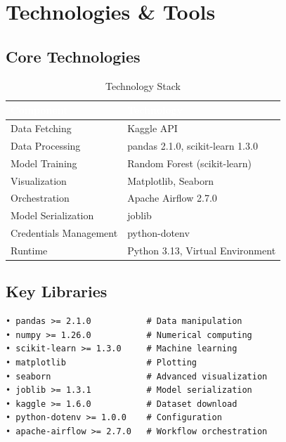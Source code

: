 \documentclass[11pt,a4paper]{article}
\begin{document}
\section{Technologies \& Tools}

\subsection{Core Technologies}

\begin{table}[H]
\centering
\caption{Technology Stack}
\small
\begin{tabular}{L{2.5cm} L{4cm}}
\toprule
{}
\textcolor{white}{\textbf{Component}} &
\textcolor{white}{\textbf{Technology}} \\
\midrule
Data Fetching & Kaggle API \\
Data Processing & pandas 2.1.0, scikit-learn 1.3.0 \\
Model Training & Random Forest (scikit-learn) \\
Visualization & Matplotlib, Seaborn \\
Orchestration & Apache Airflow 2.7.0 \\
Model Serialization & joblib \\
Credentials Management & python-dotenv \\
Runtime & Python 3.13, Virtual Environment \\
\bottomrule
\end{tabular}
\end{table}

\subsection{Key Libraries}

\begin{verbatim}
• pandas >= 2.1.0           # Data manipulation
• numpy >= 1.26.0           # Numerical computing
• scikit-learn >= 1.3.0     # Machine learning
• matplotlib                # Plotting
• seaborn                   # Advanced visualization
• joblib >= 1.3.1           # Model serialization
• kaggle >= 1.6.0           # Dataset download
• python-dotenv >= 1.0.0    # Configuration
• apache-airflow >= 2.7.0   # Workflow orchestration
\end{verbatim}

\end{document}
